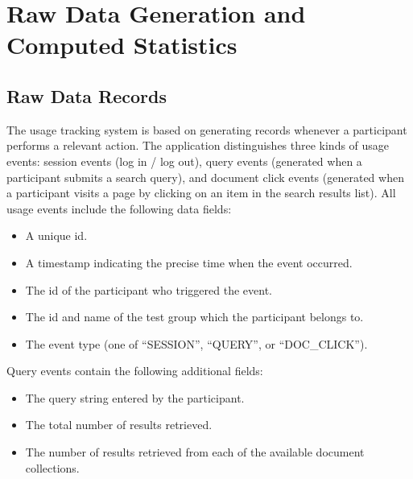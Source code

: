\documentclass[a4paper]{usiinfbachelorproject}
\begin{document}
\section{\textbf{Raw Data Generation and Computed Statistics}} \label{sec:data}

\subsection{\textbf{Raw Data Records}} \label{sec:dataRaw}

The usage tracking system is based on generating records whenever a participant performs a relevant action. The application
distinguishes three kinds of usage events: session events (log in / log out), query events (generated when a participant
submits a search query), and document click events (generated when a participant visits a page by clicking on an item in the search results list). All usage events include the following data fields:

    \begin{itemize}

        \item
        A unique id.

        \item
        A timestamp indicating the precise time when the event occurred.

        \item
        The id of the participant who triggered the event.

        \item
        The id and name of the test group which the participant belongs to.

        \item
        The event type (one of ``SESSION'', ``QUERY'', or ``DOC\_CLICK'').


    \end{itemize}

Query events contain the following additional fields:

    \begin{itemize}

        \item
        The query string entered by the participant.

        \item
        The total number of results retrieved.

        \item
        The number of results retrieved from each of the available document collections.

    \end{itemize}
\end{document}
